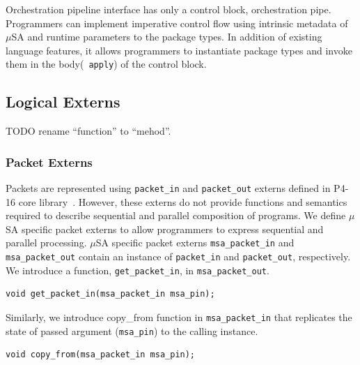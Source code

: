 Orchestration pipeline interface has only a control block, orchestration pipe.
Programmers can implement imperative control flow using intrinsic metadata of $\mu$SA and runtime parameters to the package types.
In addition of existing language features, it allows programmers to instantiate package types and invoke them in the body(~\texttt{apply}) of the control block.



% 
% 
% 


\subsection{Logical Externs}
\label{subsection:logical-externs}

TODO rename ``function'' to ``mehod''.
\subsubsection{Packet Externs}
Packets are represented using \texttt{packet\-\_in} and \texttt{packet\_out} externs defined in P4-16 core library~\cite{core.p4}.
However, these externs do not provide functions and semantics required to describe sequential and parallel composition of programs.
We define $\mu$SA specific packet externs to allow programmers to express sequential and parallel processing. 
$\mu$SA specific packet externs \texttt{msa\_packet\_in} and \texttt{msa\_packet\_out} contain an instance of \texttt{packet\_in} and \texttt{packet\_out}, respectively.
We introduce a function, \texttt{get\-\_packet\-\_in}, in \texttt{msa\-\_packet\-\_out}.
\begin{lstlisting}[frame=none]
void get_packet_in(msa_packet_in msa_pin);
\end{lstlisting}
Similarly, we introduce copy\_from function in \texttt{msa\_packet\_in} that replicates the state of passed argument (\texttt{msa\_pin}) to the calling instance.
\begin{lstlisting}[frame=none]
void copy_from(msa_packet_in msa_pin);
\end{lstlisting}

